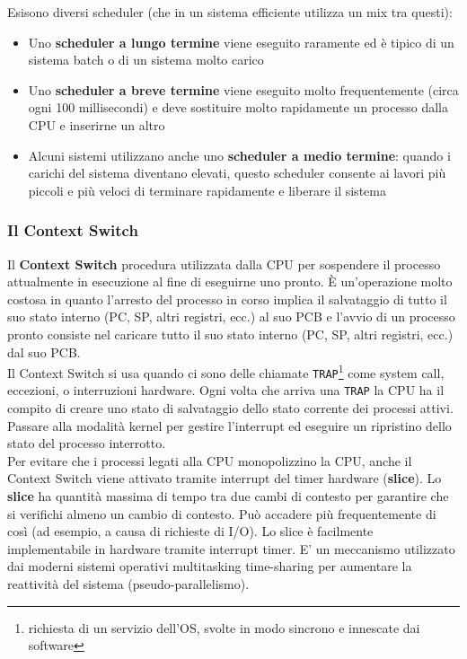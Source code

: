 \documentclass{article}
\begin{document}
Esisono diversi scheduler (che in un sistema efficiente utilizza un mix tra questi):
\begin{itemize}
    \item Uno \textbf{scheduler a lungo termine} viene eseguito raramente ed è tipico di un sistema batch o di un sistema molto carico
    \item Uno \textbf{scheduler a breve termine} viene eseguito molto frequentemente (circa ogni 100 millisecondi) e deve sostituire molto rapidamente un processo dalla CPU e inserirne un altro
    \item Alcuni sistemi utilizzano anche uno \textbf{scheduler a medio termine}: quando i carichi del sistema diventano elevati, questo scheduler consente ai lavori più piccoli e più veloci di terminare rapidamente e liberare il sistema
\end{itemize}

\subsubsection*{Il Context Switch}
Il \textbf{Context Switch} procedura utilizzata dalla CPU per sospendere il processo attualmente in esecuzione al fine di eseguirne uno pronto. È un'operazione molto costosa in quanto l'arresto del processo in corso implica il salvataggio di tutto il suo stato interno (PC, SP, altri registri, ecc.) al suo PCB e l'avvio di un processo pronto consiste nel caricare tutto il suo stato interno (PC, SP, altri registri, ecc.) dal suo PCB. \\
Il Context Switch si usa quando ci sono delle chiamate \texttt{TRAP}\footnote{richiesta di un servizio dell'OS, svolte in modo sincrono e innescate dai software} come system call, eccezioni, o interruzioni hardware. Ogni volta che arriva una \texttt{TRAP} la CPU ha il compito di creare uno stato di salvataggio dello stato corrente dei processi attivi. Passare alla modalità kernel per gestire l'interrupt ed eseguire un ripristino dello stato del processo interrotto. \\
Per evitare che i processi legati alla CPU monopolizzino la CPU, anche il Context Switch viene attivato tramite interrupt del timer hardware (\textbf{slice}).
Lo \textbf{slice} ha quantità massima di tempo tra due cambi di contesto per garantire che si verifichi almeno un cambio di contesto. Può accadere più frequentemente di così (ad esempio, a causa di richieste di I/O). Lo slice è facilmente implementabile in hardware tramite interrupt timer. E' un meccanismo utilizzato dai moderni sistemi operativi multitasking time-sharing per aumentare la reattività del sistema (pseudo-parallelismo). \\
\end{document}
